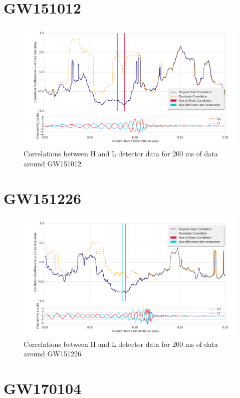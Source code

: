 \documentclass[a4paper,11pt]{article}
\begin{document}
\section{GW151012}

\begin{figure}[]
  \centering
   \includegraphics[width=\columnwidth]{GW151012CorrVsTime.png}
\caption{Correlations between H and L detector data for 200 ms of data around GW151012}
\label{fig:151012corr}
\end{figure}

\section{GW151226}

\begin{figure}[]
  \centering
    \includegraphics[width=\columnwidth]{GW151226CorrVsTime.png}
\caption{Correlations between H and L detector data for 200 ms of data around GW151226}
\label{fig:151226corr}
\end{figure}


\section{GW170104}
\end{document}
